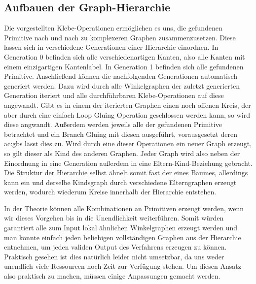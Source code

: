 \subsection{Aufbauen der Graph-Hierarchie}
Die vorgestellten Klebe-Operationen ermöglichen es uns, die gefundenen Primitive nach und nach zu komplexeren Graphen zusammenzusetzen.
Diese lassen sich in verschiedene Generationen einer Hierarchie einordnen. In Generation 0 befinden sich alle verschiedenartigen
Kanten, also alle Kanten mit einem einzigartigen Kantenlabel. In Generation 1 befinden sich alle gefundenen Primitive. Anschließend können
die nachfolgenden Generationen automatisch generiert werden. Dazu wird durch alle Winkelgraphen der zuletzt generierten Generation iteriert
und alle durchführbaren Klebe-Operationen auf diese angewandt. Gibt es in einem der iterierten Graphen einen noch offenen Kreis, der aber
durch eine einfach Loop Gluing Operation geschlossen werden kann, so wird diese angwandt. Außerdem werden jeweils alle der gefundenen Primitive
betrachtet und ein Branch Gluing mit diesen ausgeführt, vorausgesetzt deren \gls{ac:gbs} lässt dies zu.
Wird durch eine dieser Operationen ein neuer Graph erzeugt, so gilt dieser als Kind des anderen Graphen. Jeder Graph wird
also neben der Einordnung in eine Generation außerdem in eine Eltern-Kind-Beziehung gebracht. Die Struktur der Hierarchie selbst ähnelt somit
fast der eines Baumes, allerdings kann ein und derselbe Kindsgraph durch verschiedene Elterngraphen erzeugt werden, wodurch wiederum Kreise
innerhalb der Hierarchie entstehen.

In der Theorie können alle Kombinationen an Primitiven erzeugt werden, wenn wir dieses Vorgehen bis in die Unendlichkeit weiterführen. Somit
würden garantiert alle zum Input lokal ähnlichen Winkelgraphen erzeugt werden und man könnte einfach jeden beliebigen vollständigen Graphen
aus der Hierarchie entnehmen, um jeden validen Output des Verfahrens erzeugen zu können. Praktisch gesehen ist dies natürlich leider nicht
umsetzbar, da uns weder unendlich viele Ressourcen noch Zeit zur Verfügung stehen. Um diesen Ansatz also praktisch zu machen, müssen einige
Anpassungen gemacht werden.

